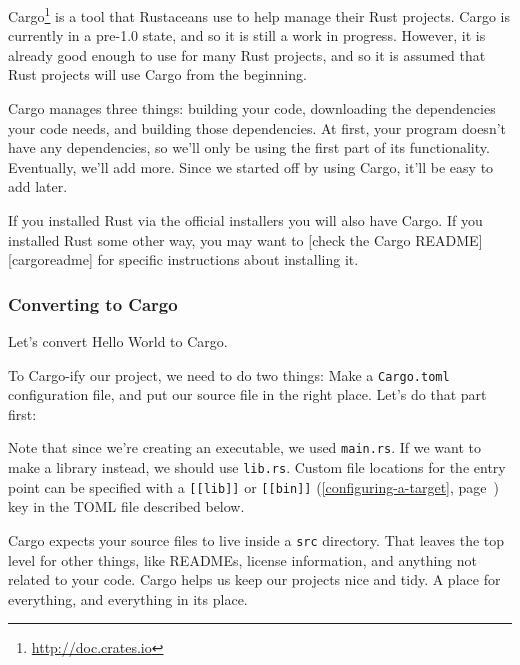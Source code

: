 \documentclass[a4paper,]{book}
\renewcommand*{\hyperref}[2][\ar]{%
  \def\ar{#2}%
  #2 (\autoref{#1}, page~\pageref{#1})}
\newenvironment{Shaded}{\begin{snugshade}}{\end{snugshade}}
\newcommand{\KeywordTok}[1]{\textcolor[rgb]{0.13,0.29,0.53}{\textbf{{#1}}}}
\newcommand{\NormalTok}[1]{{#1}}
\renewcommand{\href}[2]{#2\footnote{\url{#1}}}
\begin{document}
\href{http://doc.crates.io}{Cargo} is a tool that Rustaceans use to help
manage their Rust projects. Cargo is currently in a pre-1.0 state, and
so it is still a work in progress. However, it is already good enough to
use for many Rust projects, and so it is assumed that Rust projects will
use Cargo from the beginning.

Cargo manages three things: building your code, downloading the
dependencies your code needs, and building those dependencies. At first,
your program doesn't have any dependencies, so we'll only be using the
first part of its functionality. Eventually, we'll add more. Since we
started off by using Cargo, it'll be easy to add later.

If you installed Rust via the official installers you will also have
Cargo. If you installed Rust some other way, you may want to {[}check
the Cargo README{]}{[}cargoreadme{]} for specific instructions about
installing it.

\subsubsection{Converting to Cargo}\label{converting-to-cargo}

Let's convert Hello World to Cargo.

To Cargo-ify our project, we need to do two things: Make a
\texttt{Cargo.toml} configuration file, and put our source file in the
right place. Let's do that part first:

\begin{Shaded}
\end{Shaded}

Note that since we're creating an executable, we used \texttt{main.rs}.
If we want to make a library instead, we should use \texttt{lib.rs}.
Custom file locations for the entry point can be specified with a
\hyperref[configuring-a-target]{\texttt{{[}{[}lib{]}{]}} or
\texttt{{[}{[}bin{]}{]}}} key in the TOML file described below.

Cargo expects your source files to live inside a \texttt{src} directory.
That leaves the top level for other things, like READMEs, license
information, and anything not related to your code. Cargo helps us keep
our projects nice and tidy. A place for everything, and everything in
its place.
\end{document}
